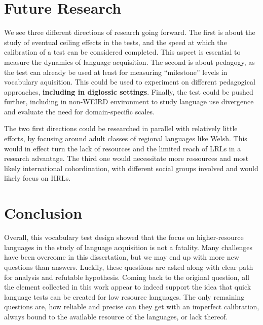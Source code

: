 \section{Future Research}
We see three different directions of research going forward. The first is about the study of eventual ceiling effects in the tests, and the speed at which the calibration of a test can be considered completed. This aspect is essential to measure the dynamics of language acquisition. The second is about pedagogy, as the test can already be used at least for measuring ``milestone'' levels in vocabulary aquisition. This could be used to experiment on different pedagogical approaches, \textbf{including in diglossic settings}. Finally, the test could be pushed further, including in non-WEIRD environment to study language use divergence and evaluate the need for domain-specific scales.

The two first directions could be researched in parallel with relatively little efforts, by focusing around adult classes of regional languages like Welsh. This would in effect turn the lack of resources and the limited reach of LRLs in a research advantage. The third one would necessitate more ressources and most likely international cohordination, with different social groups involved and would likely focus on HRLs.

\section{Conclusion}
Overall, this vocabulary test design showed that the focus on higher-resource languages in the study of language acquisition is not a fatality. Many challenges have been overcome in this dissertation, but we may end up with more new questions than answers. Luckily, these questions are asked along with clear path for analysis and refutable hypothesis. Coming back to the original question, all the element collected in this work appear to indeed support the idea that quick language tests can be created for low resource languages. The only remaining questions are, how reliable and precise can they get with an imperfect calibration, always bound to the available resource of the languages, or lack thereof. 
